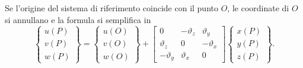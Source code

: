 Se l'origine del sistema di riferimento coincide con il punto $O$,
le coordinate di $O$ si annullano e la formula si semplifica in
\begin{equation}\label{eq:FFCI_estesa_O}
	\begin{Bmatrix} u(P) \\ v(P) \\ w(P) \end{Bmatrix}
	= \begin{Bmatrix} u(O) \\ v(O) \\ w(O) \end{Bmatrix}
	+ \begin{bmatrix}
		0 & -\vartheta_z & \vartheta_y \\
		\vartheta_z & 0 & -\vartheta_x \\
		-\vartheta_y & \vartheta_x & 0
	\end{bmatrix}
	\begin{Bmatrix}
		x(P) \\ y(P) \\ z(P)
	\end{Bmatrix}.
\end{equation}






